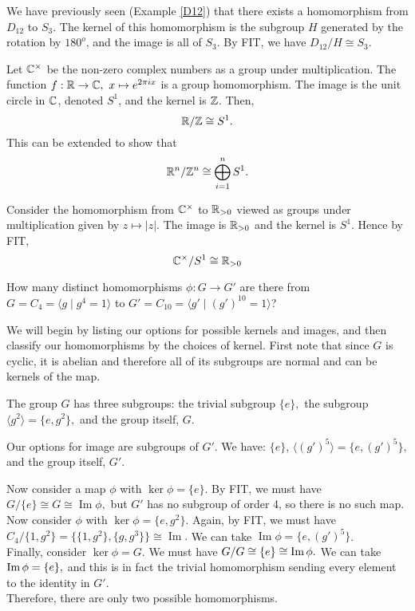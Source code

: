 \begin{example}
  We have previously seen (Example \ref{D12}) that there exists a homomorphism from $D_{12}$ to $S_3$. The kernel of 
  this homomorphism is the subgroup $H$ generated by the rotation by $180^o$, and the
  image is all of $S_3$. By FIT, we have $D_{12}/H \cong S_3$.
\end{example}
\begin{example}
  Let $\mathbb C^{\times}$ be the non-zero complex numbers as a group under multiplication. The
  function $f:\mathbb R\to\mathbb C, \text{ } x\mapsto e^{2\pi i x}$ is a group homomorphism. The image is the
  unit circle in $\mathbb C$, denoted $S^1$, and the kernel is $\mathbb Z$. Then,
  \[\mathbb R/\mathbb Z \cong S^1.\]
  This can be extended to show that 
  \[\mathbb R^n/\mathbb Z^n \cong \bigoplus_{i=1}^n S^1.\]
\end{example}

\begin{example}
  Consider the homomorphism from $\mathbb C^{\times}$ to $\mathbb R_{>0}$ viewed as groups under multiplication given by $z\mapsto |z|$. The image is $\mathbb R_{>0}$ and the kernel is
  $S^1$. Hence by FIT,
  \[\mathbb C^{\times} / S^1 \cong \mathbb R_{>0}\]
\end{example}
\begin{example}
  How many distinct homomorphisms $\phi:G\to G'$ are there from $G=C_4=\langle g \mid g^4=1\rangle$ to $ G'= C_{10}=\langle
  g' \mid (g')^{10}=1\rangle$?  

 We will begin by listing our options for possible kernels and images, and then classify our homomorphisms by the choices of kernel.
First note that since $G$ is cyclic, it is abelian and therefore all of its subgroups are normal and can be kernels of the map.

The group $G$ has three subgroups: the trivial subgroup $\{e\},$ the subgroup $\langle g^2 \rangle =\{e,g^2\},$ and the group itself, $G.$

Our options for image are subgroups of $G'.$ We have: $\{e\}$, $\langle (g')^5 \rangle =\{e,(g')^5\},$ and the group itself, $G'.$

Now consider a map $\phi$ with $\ker \phi =\{e\}$. By FIT, we must have $G/\{e\} \cong G \cong \operatorname{Im} \phi,$ but $G'$ has no subgroup of order 4, so there is no such map.\\ Now consider $\phi$ with $\ker \phi =\{e,g^2\}.$ Again, by FIT, we must have $C_4/\{1,g^2\}=\{\{1,g^2\},\{g,g^3\}\} \cong \operatorname{Im}.$ We can take $\operatorname{Im} \phi =\{e,(g')^5\}$.\\ Finally, consider $\ker \phi =G.$ We must have $G/G \cong \{e\} \cong \operatorname{Im}\phi.$ We can take $\operatorname{Im}\phi =\{e\},$ and this is in fact the trivial homomorphism sending every element to the identity in $G'.$ \\Therefore, there are only two possible homomorphisms.
\end{example}
